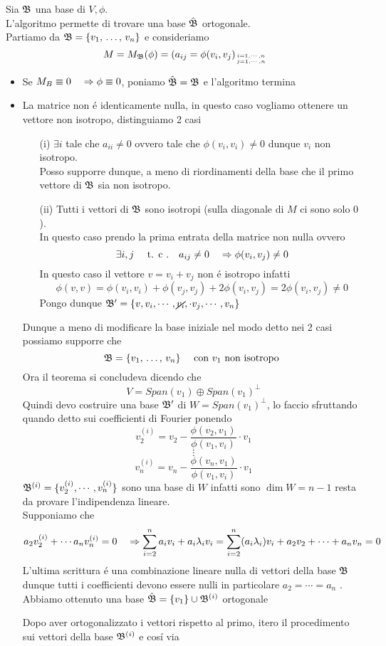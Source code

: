 \begin{al}\bianco
Sia $\mathfrak{B}$ una base di $V,\phi$.\\
L'algoritmo permette di trovare una base $\hat{\mathfrak{B}}$ ortogonale.\\
Partiamo da $\mathfrak{B}=\{ v_1, \, \dots , \, v_n \}$ e consideriamo 
$$ M= M_{\mathfrak{B}}(\phi ) = ( a_{ij} = \phi (v_i,v_j )_{i=1,\cdots, n \atop{ j=1, \cdots , n }} $$
\begin{itemize}
\item
Se $ M_B \equiv 0 \quad \Rightarrow \phi \equiv 0 $, poniamo $\hat{\mathfrak{B}}= \mathfrak{B} $ e l'algoritmo termina
\item La matrice non \'e identicamente nulla, in questo caso vogliamo ottenere un vettore non isotropo, distinguiamo 2 casi
\begin{itemize}
\item[(i)] $\exists i $ tale che $a_{ii} \neq 0 $ ovvero tale che $\phi(v_i, v_i) \neq 0 $ dunque $v_i$ non isotropo.\\
Posso supporre dunque, a meno di riordinamenti della base che il primo vettore di $\mathfrak{B}$ sia non isotropo.
\item[(ii)]Tutti i vettori di $\mathfrak{B}$ sono isotropi (sulla diagonale di $M$ ci sono solo $0$).\\
In questo caso prendo la prima entrata della matrice non nulla ovvero 
$$ \exists i,j \quad \text{ t. c .} \quad a_{ij} \neq 0 \quad \Rightarrow \phi(v_i, v_j) \neq 0 $$ 
In questo caso il vettore $ v= v_i + v_j$ non \'e isotropo infatti 
$$ \phi( v , v) = \phi(v_i, v_i) +\phi(v_j, v_j) +  2 \phi(v_i,  v_j) = 2 \phi(v_i, v_j ) \neq 0 $$
Pongo dunque $\mathfrak{B}' = \{ v, v_i, \cdots, \cancel{ v_i} , \cdot v_j , \cdots , v_n \} $
\end{itemize}
Dunque a meno di modificare la base iniziale nel modo detto nei 2 casi possiamo supporre che 
$$ \mathfrak{B} = \{ v_1, \, \dots , \, v_n \} \quad \text{ con } v_1 \text{ non isotropo } $$
Ora il teorema si concludeva dicendo che
$$ V = Span (v_1) \oplus Span(v_1)^\perp $$
Quindi devo costruire una base $\mathfrak{B}' $ di $W=Span(v_1) ^\perp $, lo faccio sfruttando quando detto sui coefficienti di Fourier ponendo
$$ v_2^{(i)} = v_2 - \frac{\phi(v_2,v_1) }{\phi(v_1, v_i ) } \cdot v_1 $$
$$ \vdots $$
$$ v_n^{(i)} = v_n - \frac{\phi(v_n,v_1) }{\phi(v_1, v_i ) } \cdot v_1 $$
$\mathfrak{B}^{(i)}= \{ v_2^{(i)} , \cdots , v_n^{(i)} \} $ sono una base di $W$ infatti sono $\dim W = n-1 $ resta da provare l'indipendenza lineare.\\
Supponiamo che 
$$ a_2 v_2^{(i)} + \cdots  a_n v_n^{(i)} = 0 \quad \Rightarrow  \sum_{i=2 }^n a_i v_i + a_i \lambda_i v_i = \sum_{i=2}^n ( a_i \lambda_i ) v_i + a_2 v_2 + \cdots + a_n v_n =0 $$ 
L'ultima scrittura \'e una combinazione lineare nulla di vettori della base $\mathfrak{B}$ dunque tutti i coefficienti devono essere nulli in particolare $a_2 =\cdots = a_n $ .\\
  Abbiamo ottenuto una base $\hat{\mathfrak{B} }= \{ v_1 \} \cup \mathfrak{B}^{(i)} $ ortogonale 

Dopo aver ortogonalizzato i vettori rispetto al primo, itero il procedimento sui vettori della base $\mathfrak{B}^{(i)}$ e cos\'i via
\end{itemize}
\end{al}

